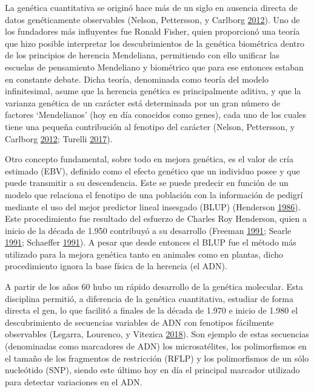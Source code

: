 \documentclass[11pt,spanish,a4paper,oneside,]{book} %
\begin{document}
La genética cuantitativa se originó hace más de un siglo en ausencia directa de datos genéticamente observables (Nelson, Pettersson, y Carlborg \protect\hyperlink{ref-cite:2}{2012}). Uno de los fundadores más influyentes fue Ronald Fisher, quien proporcionó una teoría que hizo posible interpretar los descubrimientos de la genética biométrica dentro de los principios de herencia Mendeliana, permitiendo con ello unificar las escuelas de pensamiento Mendeliano y biométrico que para ese entonces estaban en constante debate. Dicha teoría, denominada como teoría del modelo infinitesimal, asume que la herencia genética es principalmente aditiva, y que la varianza genética de un carácter está determinada por un gran número de factores `Mendelianos' (hoy en día conocidos como genes), cada uno de los cuales tiene una pequeña contribución al fenotipo del carácter (Nelson, Pettersson, y Carlborg \protect\hyperlink{ref-cite:2}{2012}; Turelli \protect\hyperlink{ref-cite:9}{2017}).

Otro concepto fundamental, sobre todo en mejora genética, es el valor de cría estimado (EBV), definido como el efecto genético que un individuo posee y que puede transmitir a su descendencia. Este se puede predecir en función de un modelo que relaciona el fenotipo de una población con la información de pedigrí mediante el uso del mejor predictor lineal insesgado (BLUP) (Henderson \protect\hyperlink{ref-cite:67}{1986}). Este procedimiento fue resultado del esfuerzo de Charles Roy Henderson, quien a inicio de la década de 1.950 contribuyó a su desarrollo (Freeman \protect\hyperlink{ref-cite:28}{1991}; Searle \protect\hyperlink{ref-cite:29}{1991}; Schaeffer \protect\hyperlink{ref-cite:27}{1991}). A pesar que desde entonces el BLUP fue el método más utilizado para la mejora genética tanto en animales como en plantas, dicho procedimiento ignora la base física de la herencia (el ADN).

A partir de los años 60 hubo un rápido desarrollo de la genética molecular. Esta disciplina permitió, a diferencia de la genética cuantitativa, estudiar de forma directa el gen, lo que facilitó a finales de la década de 1.970 e inicio de 1.980 el descubrimiento de secuencias variables de ADN con fenotipos fácilmente observables (Legarra, Lourenco, y Vitezica \protect\hyperlink{ref-cite:30}{2018}). Son ejemplo de estas secuencias (denominadas como marcadores de ADN) los microsatélites, los polimorfismos en el tamaño de los fragmentos de restricción (RFLP) y los polimorfismos de un sólo nucleótido (SNP), siendo este último hoy en día el principal marcador utilizado para detectar variaciones en el ADN.
\end{document}
